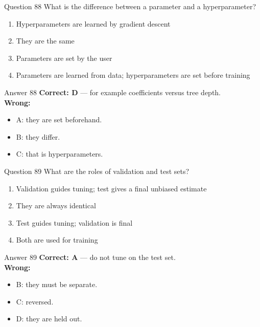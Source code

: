 \documentclass[aspectratio=169,11pt]{beamer}
\begin{document}
\begin{frame}{Question 88}
What is the difference between a parameter and a hyperparameter?
\begin{enumerate}[label=\Alph*.]
\item Hyperparameters are learned by gradient descent
\item They are the same
\item Parameters are set by the user
\item Parameters are learned from data; hyperparameters are set before training
\end{enumerate}
\end{frame}
\begin{frame}{Answer 88}
\textbf{Correct: D} --- for example coefficients versus tree depth.\\
\vspace{0.5em}
\textbf{Wrong:}
\begin{itemize}
\item A: they are set beforehand.
\item B: they differ.
\item C: that is hyperparameters.
\end{itemize}
\end{frame}

\begin{frame}{Question 89}
What are the roles of validation and test sets?
\begin{enumerate}[label=\Alph*.]
\item Validation guides tuning; test gives a final unbiased estimate
\item They are always identical
\item Test guides tuning; validation is final
\item Both are used for training
\end{enumerate}
\end{frame}
\begin{frame}{Answer 89}
\textbf{Correct: A} --- do not tune on the test set.\\
\vspace{0.5em}
\textbf{Wrong:}
\begin{itemize}
\item B: they must be separate.
\item C: reversed.
\item D: they are held out.
\end{itemize}
\end{frame}
\end{document}
